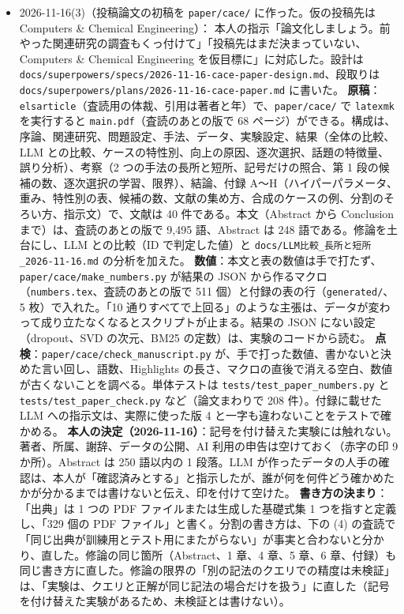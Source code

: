 \documentclass[11pt,a4paper]{jsarticle}
\begin{document}
\begin{itemize}[nosep]
  \item 2026-11-16(3)（投稿論文の初稿を \texttt{paper/cace/} に作った。仮の投稿先は Computers \& Chemical Engineering）：
    本人の指示「論文化しましょう。前やった関連研究の調査もくっ付けて」「投稿先はまだ決まっていない、Computers \& Chemical Engineering を仮目標に」に対応した。設計は \texttt{docs/superpowers/specs/2026-11-16-cace-paper-design.md}、段取りは \texttt{docs/superpowers/plans/2026-11-16-cace-paper.md} に書いた。
    \textbf{原稿}：\texttt{elsarticle}（査読用の体裁、引用は著者と年）で、\texttt{paper/cace/} で \texttt{latexmk} を実行すると \texttt{main.pdf}（査読のあとの版で 68 ページ）ができる。構成は、序論、関連研究、問題設定、手法、データ、実験設定、結果（全体の比較、LLM との比較、ケースの特性別、向上の原因、逐次選択、話題の特徴量、誤り分析）、考察（2 つの手法の長所と短所、記号だけの照合、第 1 段の候補の数、逐次選択の学習、限界）、結論、付録 A〜H（ハイパーパラメータ、重み、特性別の表、候補の数、文献の集め方、合成のケースの例、分割のそろい方、指示文）で、文献は 40 件である。本文（Abstract から Conclusion まで）は、査読のあとの版で 9,495 語、Abstract は 248 語である。修論を土台にし、LLM との比較（ID で判定した値）と \texttt{docs/LLM比較\_長所と短所\_2026-11-16.md} の分析を加えた。
    \textbf{数値}：本文と表の数値は手で打たず、\texttt{paper/cace/make\_numbers.py} が結果の JSON から作るマクロ（\texttt{numbers.tex}、査読のあとの版で 511 個）と付録の表の行（\texttt{generated/}、5 枚）で入れた。「10 通りすべてで上回る」のような主張は、データが変わって成り立たなくなるとスクリプトが止まる。結果の JSON にない設定（dropout、SVD の次元、BM25 の定数）は、実験のコードから読む。
    \textbf{点検}：\texttt{paper/cace/check\_manuscript.py} が、手で打った数値、書かないと決めた言い回し、語数、Highlights の長さ、マクロの直後で消える空白、数値が古くないことを調べる。単体テストは \texttt{tests/test\_paper\_numbers.py} と \texttt{tests/test\_paper\_check.py} など（論文まわりで 208 件）。付録に載せた LLM への指示文は、実際に使った版 4 と一字も違わないことをテストで確かめる。
    \textbf{本人の決定（2026-11-16）}：記号を付け替えた実験には触れない。著者、所属、謝辞、データの公開、AI 利用の申告は空けておく（赤字の印 9 か所）。Abstract は 250 語以内の 1 段落。LLM が作ったデータの人手の確認は、本人が「確認済みとする」と指示したが、誰が何を何件どう確かめたかが分かるまでは書けないと伝え、印を付けて空けた。
    \textbf{書き方の決まり}：「出典」は 1 つの PDF ファイルまたは生成した基礎式集 1 つを指すと定義し、「329 個の PDF ファイル」と書く。分割の書き方は、下の (4) の査読で「同じ出典が訓練用とテスト用にまたがらない」が事実と合わないと分かり、直した。修論の同じ箇所（Abstract、1 章、4 章、5 章、6 章、付録）も同じ書き方に直した。修論の限界の「別の記法のクエリでの精度は未検証」は、「実験は、クエリと正解が同じ記法の場合だけを扱う」に直した（記号を付け替えた実験があるため、未検証とは書けない）。

\end{itemize}
\end{document}
